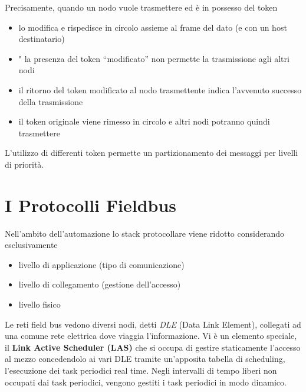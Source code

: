 \documentclass[10pt, letterpaper]{report}
\begin{document}
Precisamente, quando un nodo vuole trasmettere ed è in possesso del token\begin{itemize}
    \item  lo modifica e
    rispedisce in circolo assieme al frame del dato (e con un host destinatario)
    \item " la presenza del token “modificato” non permette la trasmissione agli altri nodi
    \item il ritorno del token modificato al nodo trasmettente indica l'avvenuto successo della trasmissione \item il
    token originale viene rimesso in circolo e altri nodi potranno quindi trasmettere
\end{itemize}
L'utilizzo di differenti token permette un partizionamento dei messaggi per livelli di priorità.\flowerLine 
\section{I Protocolli Fieldbus}
Nell'ambito dell'automazione lo stack protocollare viene ridotto considerando esclusivamente \begin{itemize}
    \item livello di applicazione (tipo di comunicazione)
    \item livello di collegamento (gestione dell'accesso)
    \item livello fisico
\end{itemize}
Le reti field bus vedono diversi nodi, detti \textit{DLE} (Data Link Element), collegati ad una comune rete elettrica dove viaggia l'informazione. Vi è un elemento speciale, il \textbf{Link Active Scheduler (LAS)} che si occupa di gestire staticamente l'accesso al mezzo concedendolo ai vari DLE tramite un'apposita tabella di scheduling, l'esecuzione dei task periodici real time. Negli intervalli di tempo liberi non occupati dai task periodici, vengono gestiti i task periodici in modo dinamico.\acc 
\end{document}
